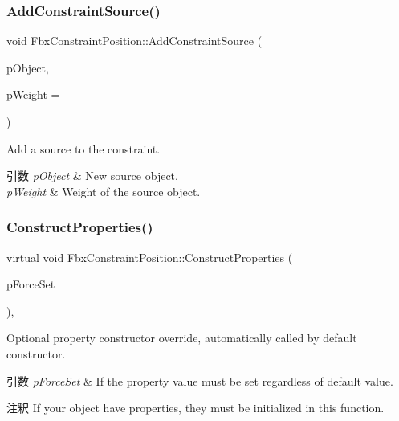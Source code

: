 \subsubsection{\texorpdfstring{Add\+Constraint\+Source()}{AddConstraintSource()}}
{\footnotesize\ttfamily void Fbx\+Constraint\+Position\+::\+Add\+Constraint\+Source (\begin{DoxyParamCaption}\item[{\hyperlink{class_fbx_object}{Fbx\+Object} $\ast$}]{p\+Object,  }\item[{double}]{p\+Weight = {} }\end{DoxyParamCaption})}

Add a source to the constraint. 
\begin{DoxyParams}{引数}
{\em p\+Object} & New source object. \\
\hline
{\em p\+Weight} & Weight of the source object. \\
\hline
\end{DoxyParams}
\mbox{\label{class_fbx_constraint_position_adb2f3e784d01313ecc859b7cda16c182}} 
\subsubsection{\texorpdfstring{Construct\+Properties()}{ConstructProperties()}}
{\footnotesize\ttfamily virtual void Fbx\+Constraint\+Position\+::\+Construct\+Properties (\begin{DoxyParamCaption}\item[{bool}]{p\+Force\+Set }\end{DoxyParamCaption})\hspace{0.3cm}{\ttfamily [protected]}, {\ttfamily [virtual]}}

Optional property constructor override, automatically called by default constructor. 
\begin{DoxyParams}{引数}
{\em p\+Force\+Set} & If the property value must be set regardless of default value. \\
\hline
\end{DoxyParams}
\begin{DoxyRemark}{注釈}
If your object have properties, they must be initialized in this function. 
\end{DoxyRemark}


